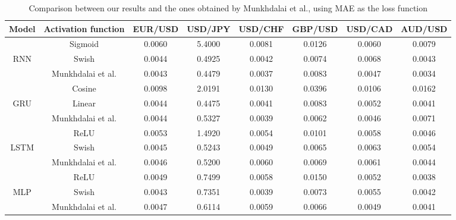 \documentclass{ieeeaccess}
\begin{document}
\begin{table}[t]
  \caption{Comparison between our results and the ones obtained by Munkhdalai et al., using MAE as the loss function}
  \scriptsize
  \centering
  \begin{tabular*}{0.9\textwidth}{c @{\extracolsep{\fill}} ccccccc}
    \hline
    \textbf{Model} & \textbf{Activation function} & \textbf{EUR/USD} & \textbf{USD/JPY} & \textbf{USD/CHF} & \textbf{GBP/USD} & \textbf{USD/CAD} & \textbf{AUD/USD} \\
    \hline

          & Sigmoid & 0.0060 & 5.4000 & 0.0081 & 0.0126 & 0.0060 & 0.0079 \\
    RNN   & Swish & 0.0044 & 0.4925 & 0.0042 & 0.0074 & 0.0068 & 0.0043 \\
          & Munkhdalai et al. & 0.0043 & 0.4479 & 0.0037 & 0.0083 & 0.0047 & 0.0034 \\
    \hline
          & Cosine & 0.0098 & 2.0191 & 0.0130 & 0.0396 & 0.0106 & 0.0162 \\
    GRU   & Linear & 0.0044 & 0.4475 & 0.0041 & 0.0083 & 0.0052 & 0.0041 \\
          & Munkhdalai et al. & 0.0044 & 0.5327 & 0.0039 & 0.0062 & 0.0046 & 0.0071 \\
    \hline
          & ReLU & 0.0053 & 1.4920 & 0.0054 & 0.0101 & 0.0058 & 0.0046 \\
    LSTM  & Swish & 0.0045 & 0.5243 & 0.0049 & 0.0065 & 0.0063 & 0.0054 \\
          & Munkhdalai et al. & 0.0046 & 0.5200 & 0.0060 & 0.0069 & 0.0061 & 0.0044 \\
    \hline

          & ReLU & 0.0049 & 0.7499 & 0.0058 & 0.0150 & 0.0052 & 0.0038 \\
    MLP   & Swish & 0.0043 & 0.7351 & 0.0039 & 0.0073 & 0.0055 & 0.0042 \\
          & Munkhdalai et al. & 0.0047 & 0.6114 & 0.0059 & 0.0066 & 0.0049 & 0.0041 \\
          


\end{tabular*}
\end{table}
\end{document}
